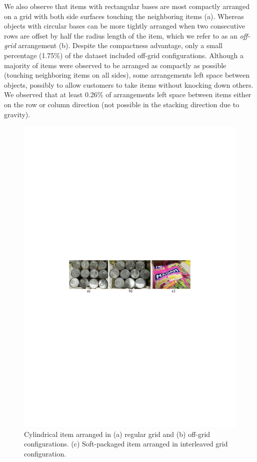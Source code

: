 We also observe that items with rectangular bases are most compactly arranged on a grid with both side surfaces touching the neighboring items (a).
Whereas objects with circular bases can be more tightly arranged when two consecutive rows are offset by half the radius length of the item, which we refer to as an {\em off-grid} arrangement  (b).
Despite the compactness advantage, only a small percentage (1.75\%) of the dataset included off-grid configurations.
Although a majority of items were observed to be arranged as compactly as possible (touching neighboring items on all sides), some arrangements left space between objects, possibly to allow customers to take items without knocking down others.
We observed that at least 0.26\% of arrangements left space between items either on the row or column direction (not possible in the stacking direction due to gravity).

\begin{figure}[h]
	\centering
	\includegraphics[width=0.8\linewidth]{figures/complex-config}
	\caption{Cylindrical item arranged in (a) regular grid and (b) off-grid configurations. (c) Soft-packaged item arranged in interleaved grid configuration.}
	\label{fig:off-grid}
\end{figure}




